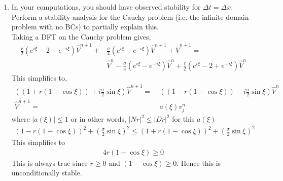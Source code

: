 \documentclass[11pt]{article}
\newcommand{\vnj}{v^{n}_{j}}
\newcommand{\vhnp}{\hat{V}^{n+1}}
\newcommand{\vhn}{\hat{V}^n}
\newcommand{\bra}[1]{\left(#1\right)}
\begin{document}
\begin{enumerate}
\begin{enumerate}
      \item {\color{red}In your computations, you should have observed stability for $\Delta t = \Delta x$. Perform a stability analysis for the Cauchy problem (i.e. the infinite domain problem with no BCs) to partially explain this.} \\
      Taking a DFT on the Cauchy problem gives,
      \begin{align*}
      \frac{r}{2}\bra{e^{i\xi}-2+e^{-i\xi}}\vhnp +& \frac{\sigma}{4}\bra{e^{i\xi}-e^{-i\xi}}\vhnp + \vhnp =  \\
      & \vhn - \frac{\sigma}{4}\bra{e^{i\xi}-e^{-i\xi}}\vhn + \frac{r}{2}\bra{e^{i\xi}-2+e^{-i\xi}}\vhn
      \end{align*}
      This simplifies to, 
      \begin{align*}
    \bra{\bra{1+r(1-\cos\xi)} + i \frac{\sigma}{2}\sin\xi}\vhnp =& \  \bra{\bra{1-r(1-\cos\xi)} - i \frac{\sigma}{2}\sin\xi}\vhn \\
    \vhnp =& \ a(\xi)\vnj
      \end{align*}
      where $\left|a(\xi)\right|\leq1$ or in other words, $|Nr|^2 \leq |Dr|^2$ for this $a(\xi)$
      \begin{align*}
      \bra{1-r(1-\cos\xi)}^2 + \bra{\frac{\sigma}{2}\sin\xi}^2 \leq \bra{1+r(1-\cos\xi)}^2 + \bra{\frac{\sigma}{2}\sin\xi}^2
      \end{align*}
      This simplifies to 
      \begin{align*}
      4r\bra{1-\cos\xi} \geq 0
      \end{align*}
      This is always true since $r\geq 0$ and $\bra{1-\cos\xi}\geq 0$. Hence this is unconditionally stable.
    \end{enumerate}
    

\end{enumerate}
\end{document}
